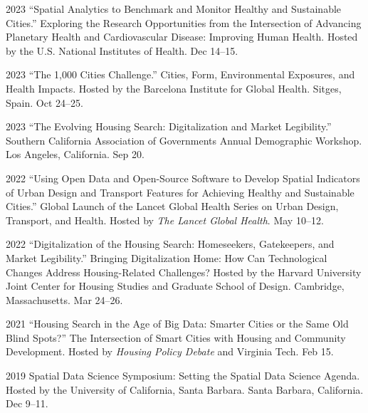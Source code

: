 \documentclass[11pt,letterpaper]{report}
\begin{document}
    \begin{tablist}

    \item[2023] \tab{}\enquote{Spatial Analytics to Benchmark and Monitor Healthy and Sustainable Cities.} Exploring the Research Opportunities from the Intersection of Advancing Planetary Health and Cardiovascular Disease: Improving Human Health. Hosted by the U.S. National Institutes of Health. Dec 14--15.

    \item[2023] \tab{}\enquote{The 1,000 Cities Challenge.} Cities, Form, Environmental Exposures, and Health Impacts. Hosted by the Barcelona Institute for Global Health. Sitges, Spain. Oct 24--25.

    \item[2023] \tab{}\enquote{The Evolving Housing Search: Digitalization and Market Legibility.} Southern California Association of Governments Annual Demographic Workshop. Los Angeles, California. Sep 20.

    \item[2022] \tab{}\enquote{Using Open Data and Open-Source Software to Develop Spatial Indicators of Urban Design and Transport Features for Achieving Healthy and Sustainable Cities.} Global Launch of the Lancet Global Health Series on Urban Design, Transport, and Health. Hosted by \textit{The Lancet Global Health}. May 10--12.

    \item[2022] \tab{}\enquote{Digitalization of the Housing Search: Homeseekers, Gatekeepers, and Market Legibility.} Bringing Digitalization Home: How Can Technological Changes Address Housing-Related Challenges? Hosted by the Harvard University Joint Center for Housing Studies and Graduate School of Design. Cambridge, Massachusetts. Mar 24--26.

    \item[2021] \tab{}\enquote{Housing Search in the Age of Big Data: Smarter Cities or the Same Old Blind Spots?} The Intersection of Smart Cities with Housing and Community Development. Hosted by \textit{Housing Policy Debate} and Virginia Tech. Feb 15.

    \item[2019] \tab{}Spatial Data Science Symposium: Setting the Spatial Data Science Agenda. Hosted by the University of California, Santa Barbara. Santa Barbara, California. Dec 9--11.

    \end{tablist}
\end{document}
